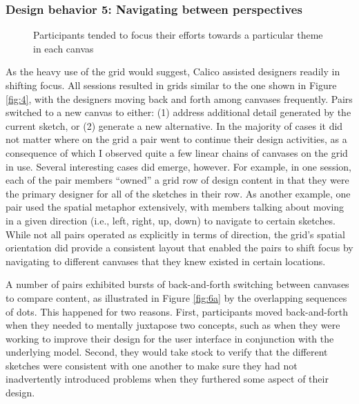 \subsubsection {Design behavior 5: Navigating between perspectives}
\label{results:21}

\begin{figure}%
  \centering
   \caption {Participants tended to focus their efforts towards a particular theme in each canvas}
   \label{fig:7}
\end{figure}%

As the heavy use of the grid would suggest, Calico assisted designers readily in shifting focus. All sessions resulted in grids similar to the one shown in Figure \ref{fig:4}, with the designers moving back and forth among canvases frequently. Pairs switched to a new canvas to either: (1) address additional detail generated by the current sketch, or (2) generate a new alternative. In the majority of cases it did not matter where on the grid a pair went to continue their design activities, as a consequence of which I observed quite a few linear chains of canvases on the grid in use. Several interesting cases did emerge, however. For example, in one session, each of the pair members ``owned'' a grid row of design content in that they were the primary designer for all of the sketches in their row. As another example, one pair used the spatial metaphor extensively, with members talking about moving in a given direction (i.e., left, right, up, down) to navigate to certain sketches. While not all pairs operated as explicitly in terms of direction, the grid's spatial orientation did provide a consistent layout that enabled the pairs to shift focus by navigating to different canvases that they knew existed in certain locations.   

A number of pairs exhibited bursts of back-and-forth switching between canvases to compare content, as illustrated in Figure \ref{fig:6a} by the overlapping sequences of dots. This happened for two reasons. First, participants moved back-and-forth when they needed to mentally juxtapose two concepts, such as when they were working to improve their design for the user interface in conjunction with the underlying model. Second, they would take stock to verify that the different sketches were consistent with one another to make sure they had not inadvertently introduced problems when they furthered some aspect of their design.

